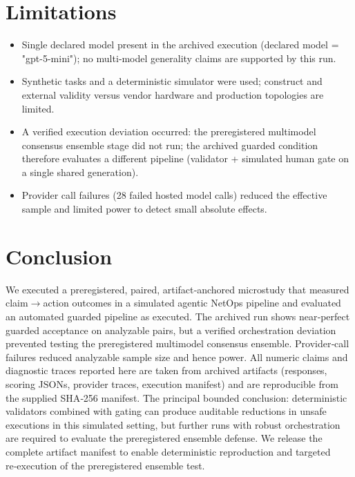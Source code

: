 \documentclass[conference]{IEEEtran}
\begin{document}
\section{Limitations}
\begin{itemize}
\item Single declared model present in the archived execution (declared model = "gpt-5-mini"); no multi‑model generality claims are supported by this run.
\item Synthetic tasks and a deterministic simulator were used; construct and external validity versus vendor hardware and production topologies are limited.
\item A verified execution deviation occurred: the preregistered multimodel consensus ensemble stage did not run; the archived guarded condition therefore evaluates a different pipeline (validator + simulated human gate on a single shared generation).
\item Provider call failures (28 failed hosted model calls) reduced the effective sample and limited power to detect small absolute effects.
\end{itemize}

\section{Conclusion}
We executed a preregistered, paired, artifact‑anchored microstudy that measured claim\ensuremath{\rightarrow}action outcomes in a simulated agentic NetOps pipeline and evaluated an automated guarded pipeline as executed. The archived run shows near‑perfect guarded acceptance on analyzable pairs, but a verified orchestration deviation prevented testing the preregistered multimodel consensus ensemble. Provider‑call failures reduced analyzable sample size and hence power. All numeric claims and diagnostic traces reported here are taken from archived artifacts (responses, scoring JSONs, provider traces, execution manifest) and are reproducible from the supplied SHA‑256 manifest. The principal bounded conclusion: deterministic validators combined with gating can produce auditable reductions in unsafe executions in this simulated setting, but further runs with robust orchestration are required to evaluate the preregistered ensemble defense. We release the complete artifact manifest to enable deterministic reproduction and targeted re‑execution of the preregistered ensemble test.
\end{document}
